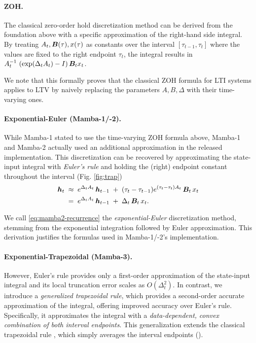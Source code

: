\paragraph{ZOH.}
The classical zero-order hold discretization method can be derived from the foundation above with a specific approximation of the right-hand side integral.
By treating $A_t, {\bm{B}}(\tau), x(\tau)$ as constants over the interval $[\tau_{t-1}, \tau_t]$ where the values are fixed to the right endpoint $\tau_t$, the integral results in $A_t^{-1}\,\left(\exp(\Delta_tA_t) - I\right){\bm{B}}_tx_t$.

We note that this formally proves that the classical ZOH formula for LTI systems applies to LTV by naively replacing the parameters $A, B, \Delta$ with their time-varying ones.

\paragraph{Exponential-Euler (Mamba-1/-2).}
While Mamba-1 stated to use the time-varying ZOH formula above, Mamba-1 and Mamba-2 actually used an additional approximation in the released implementation.
This discretization can be recovered by approximating the state-input integral with \emph{Euler's rule} \citep{Süli_Mayers_2003} and holding the (right) endpoint constant throughout the interval (Fig. \ref{fig:trap})
\begin{align}
    {\bm{h}}_t \;&\approx\; e^{\Delta_t A_t}\,{\bm{h}}_{t-1} 
        \;+\; (\tau_t - \tau_{t-1}) e^{(\tau_t-\tau_t) A_t}\,{\bm{B}}_t\,x_t \nonumber \\
    &=\; e^{\Delta_t A_t}\,{\bm{h}}_{t-1} 
        \;+\; \Delta_t\,{\bm{B}}_t\,x_t.
    \label{eq:mamba2-recurrence}
\end{align}

We call \eqref{eq:mamba2-recurrence}
the \emph{exponential-Euler} discretization method,
stemming from the exponential integration followed by Euler approximation.
This derivation justifies the formulas used in Mamba-1/-2's implementation.

\paragraph{Exponential-Trapezoidal (Mamba-3).}

However, Euler's rule provides only a first-order approximation of the state-input integral and its local truncation error scales as $O(\Delta_t^2)$.
In contrast, we introduce a \emph{generalized trapezoidal rule}, which provides a second-order accurate approximation of the integral, offering improved accuracy over Euler's rule.
Specifically, it approximates the integral with a \emph{data-dependent, convex combination of both interval endpoints}.
This generalization extends the classical trapezoidal rule \citep{Süli_Mayers_2003}, which simply averages the interval endpoints ().


